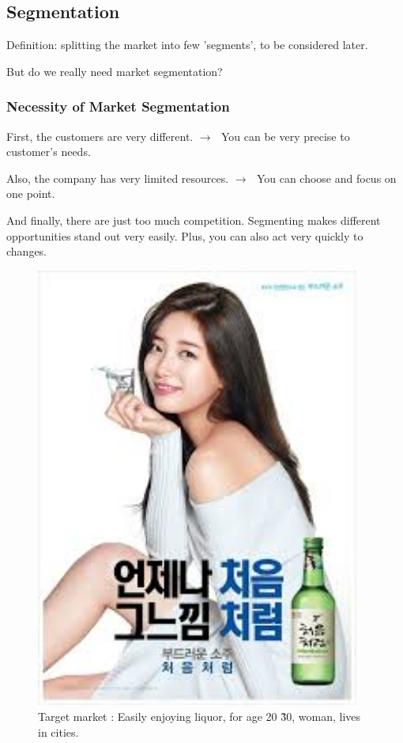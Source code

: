 \documentclass[12pt]{article}
\newcommand{\ra}{$\rightarrow \text{ }$}
\begin{document}
\subsection{Segmentation}

Definition: splitting the market into few 'segments', to be considered later.


But do we really need market segmentation?

\subsubsection{Necessity of Market Segmentation}

First, the customers are very different. \ra You can be very precise to customer's needs.

Also, the company has very limited resources. \ra You can choose and focus on one point.

And finally, there are just too much competition.
Segmenting makes different opportunities stand out
very easily.
Plus, you can also act very quickly to changes.

\begin{figure}[H]
	\centering
	\includegraphics[width=0.95\textwidth]{img/soju.png}
	\caption{Target market : Easily enjoying liquor, for age 20 \~30, woman, lives in cities.}
	\label{soju}
\end{figure}
\end{document}
